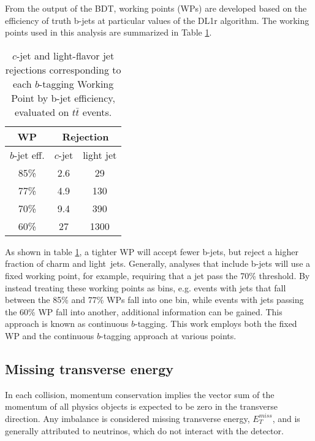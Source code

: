 From the output of the BDT, working points (WPs) are developed based on the efficiency of truth b-jets at particular values of the DL1r algorithm. The working points used in this analysis are summarized in Table \ref{tab:btag_WPs}. 

\begin{table}[H] 
\begin{center}
\begin{tabular}{|c|c|c|}
     \hline
    WP & \multicolumn{2}{c|}{Rejection}\\
    \hline
    $b$-jet eff. & $c$-jet & light jet\\
    \hline
     85\% & 2.6 & 29 \\
     77\% & 4.9 & 130 \\
     70\% & 9.4 & 390 \\
     60\% & 27 & 1300 \\
     \hline
     \end{tabular}
    \caption{$c$-jet and light-flavor jet rejections corresponding to each $b$-tagging Working Point by b-jet efficiency, evaluated on $t\bar{t}$ events.}
     \label{tab:btag_WPs}
     \end{center}
\end{table}

As shown in table \ref{tab:btag_WPs}, a tighter WP will accept fewer b-jets, but reject a higher fraction of charm and light\
 jets. Generally, analyses that include b-jets will use a fixed working point, for example, requiring that a jet pass the 70\% threshold. By instead treating these working points as bins, e.g. events with jets that fall between the 85\% and 77\% WPs fall into one bin, while events with jets passing the 60\% WP fall into another, additional information can be gained. This approach is known as continuous $b$-tagging. This work employs both the fixed WP and the continuous $b$-tagging approach at various points.

\subsection{Missing transverse energy}
\label{subsec:met}

In each collision, momentum conservation implies the vector sum of the momentum of all physics objects is expected to be zero in the transverse direction. Any imbalance is considered missing transverse energy, $E_T^{miss}$, and is generally attributed to neutrinos, which do not interact with the detector.  

